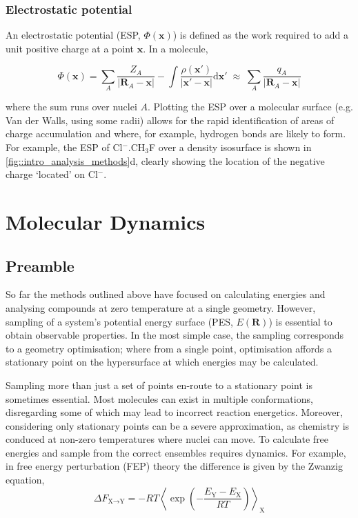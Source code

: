 \documentclass[main.tex]{subfiles}
\begin{document}
\subsubsection{Electrostatic potential}

An electrostatic potential (ESP, $\Phi(\boldsymbol{x})$) is defined as the work required to add a unit positive charge at a point $\boldsymbol{x}$. In a molecule,

\begin{equation}
	\Phi(\boldsymbol{x}) = \sum_A \frac{Z_A}{|\boldsymbol{R}_A - \boldsymbol{x}|} - \int \frac{\rho(\boldsymbol{x'})}{|\boldsymbol{x'} - \boldsymbol{x}|} \text{d}\boldsymbol{x}' \;\approx\; \sum_A \frac{q_A}{|\boldsymbol{R}_A - \boldsymbol{x}|}
\end{equation}

where the sum runs over nuclei $A$. Plotting the ESP over a molecular surface (e.g. Van der Walls, using some radii) allows for the rapid identification of areas of charge accumulation and where, for example, hydrogen bonds are likely to form.\cite{Politzer2001} For example, the ESP of Cl${}^{-}$.CH${}_3$F over a density isosurface is shown in \figurename{ \ref{fig::intro_analysis_methods}d}, clearly showing the location of the negative charge `located' on Cl${}^{-}$.


\section{Molecular Dynamics}
\subsection{Preamble}
So far the methods outlined above have focused on calculating energies and analysing compounds at zero temperature at a single geometry. However, sampling of a system's potential energy surface (PES, $E(\boldsymbol{R})$) is essential to obtain observable properties. In the most simple case, the sampling corresponds to a geometry optimisation; where from a single point, optimisation affords a stationary point on the hypersurface at which energies may be calculated. 

Sampling more than just a set of points en-route to a stationary point is sometimes essential. Most molecules can exist in multiple conformations, disregarding some of which may lead to incorrect reaction energetics.\cite{Hawkins2017} Moreover, considering only stationary points can be a severe approximation, as chemistry is conduced at non-zero temperatures where nuclei can move. To calculate free energies and sample from the correct ensembles requires dynamics. For example, in free energy perturbation (FEP)  theory the difference is given by the Zwanzig equation,
\begin{equation}
	\Delta F_{\text{X}\rightarrow\text{Y}} = -R T \left\langle \exp\left( - \frac{E_\text{Y} - E_\text{X}}{RT} \right) \right\rangle_\text{X}
	\label{equation::zwanzig}
\end{equation}
\end{document}
